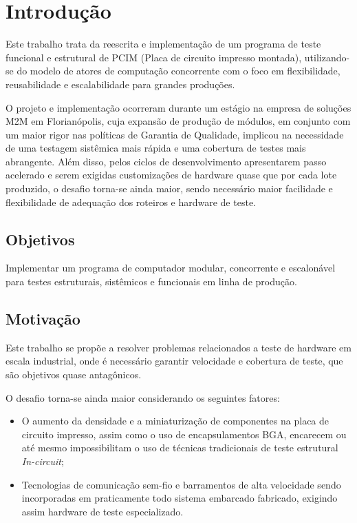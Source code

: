\chapter{Introdução}
\label{intro}
    
    Este trabalho trata da reescrita e implementação de um programa de teste funcional e estrutural de PCIM (Placa de circuito impresso montada), utilizando-se do modelo de atores de computação concorrente \citep{hewitt2010actor, hewitt2013computation} 
    com o foco em flexibilidade, reusabilidade e escalabilidade para grandes produções. 
  
    O projeto e implementação ocorreram durante um estágio na empresa de soluções M2M em Florianópolis, cuja expansão de produção de módulos, em conjunto com um maior rigor nas políticas de Garantia de Qualidade, implicou na necessidade de uma testagem sistêmica mais rápida e uma cobertura de testes mais abrangente. Além disso, pelos ciclos de desenvolvimento apresentarem passo acelerado e serem exigidas customizações de hardware quase que por cada lote produzido, o desafio torna-se ainda maior, sendo necessário maior facilidade e flexibilidade de adequação dos roteiros e hardware de teste.
    
\section{Objetivos}
    Implementar um programa de computador modular, concorrente e escalonável para testes estruturais, sistêmicos e funcionais em linha de produção.
    
\section{Motivação}
    Este trabalho se propõe a resolver problemas relacionados a teste de hardware em escala industrial, onde é necessário garantir velocidade e cobertura de teste, que são objetivos quase antagônicos.
    
    O desafio torna-se ainda maior considerando os seguintes fatores:
    \begin{itemize}
        \item O aumento da densidade e a miniaturização de componentes na placa de circuito impresso, assim como o uso de encapsulamentos BGA, encarecem ou até mesmo impossibilitam o uso de técnicas tradicionais de teste estrutural \textit{In-circuit};
        \item Tecnologias de comunicação sem-fio e barramentos de alta velocidade sendo incorporadas em praticamente todo sistema embarcado fabricado, exigindo assim hardware de teste especializado.
    \end{itemize}
    
